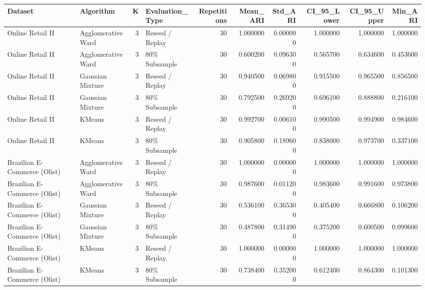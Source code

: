 \begin{tabular}{llrlrrrrrr}
\toprule
Dataset & Algorithm & K & Evaluation\_Type & Repetitions & Mean\_ARI & Std\_ARI & CI\_95\_Lower & CI\_95\_Upper & Min\_ARI \\
\midrule
Online Retail II & Agglomerative Ward & 3 & Reseed / Replay & 30 & 1.000000 & 0.000000 & 1.000000 & 1.000000 & 1.000000 \\
Online Retail II & Agglomerative Ward & 3 & 80\% Subsample & 30 & 0.600200 & 0.096300 & 0.565700 & 0.634600 & 0.453600 \\
Online Retail II & Gaussian Mixture & 3 & Reseed / Replay & 30 & 0.940500 & 0.069800 & 0.915500 & 0.965500 & 0.856500 \\
Online Retail II & Gaussian Mixture & 3 & 80\% Subsample & 30 & 0.792500 & 0.269200 & 0.696100 & 0.888800 & 0.216100 \\
Online Retail II & KMeans & 3 & Reseed / Replay & 30 & 0.992700 & 0.006100 & 0.990500 & 0.994900 & 0.984600 \\
Online Retail II & KMeans & 3 & 80\% Subsample & 30 & 0.905800 & 0.189600 & 0.838000 & 0.973700 & 0.337100 \\
Brazilian E-Commerce (Olist) & Agglomerative Ward & 3 & Reseed / Replay & 30 & 1.000000 & 0.000000 & 1.000000 & 1.000000 & 1.000000 \\
Brazilian E-Commerce (Olist) & Agglomerative Ward & 3 & 80\% Subsample & 30 & 0.987600 & 0.011200 & 0.983600 & 0.991600 & 0.973800 \\
Brazilian E-Commerce (Olist) & Gaussian Mixture & 3 & Reseed / Replay & 30 & 0.536100 & 0.365300 & 0.405400 & 0.666800 & 0.106200 \\
Brazilian E-Commerce (Olist) & Gaussian Mixture & 3 & 80\% Subsample & 30 & 0.487800 & 0.314900 & 0.375200 & 0.600500 & 0.099600 \\
Brazilian E-Commerce (Olist) & KMeans & 3 & Reseed / Replay & 30 & 1.000000 & 0.000000 & 1.000000 & 1.000000 & 1.000000 \\
Brazilian E-Commerce (Olist) & KMeans & 3 & 80\% Subsample & 30 & 0.738400 & 0.352000 & 0.612400 & 0.864300 & 0.101300 \\
\bottomrule
\end{tabular}
